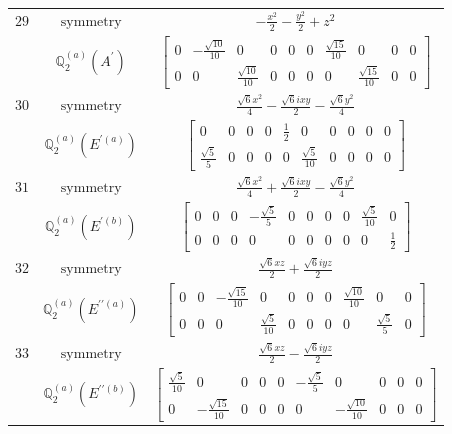 \documentclass[fleqn,8pt,landscape]{jsarticle}
\begin{document}
\begin{longtable}{ccc}
$ 29 $ & $ \text{symmetry} $ & $ - \frac{x^{2}}{2} - \frac{y^{2}}{2} + z^{2} $ \\
$  $ & $ \mathbb{Q}_{2}^{(a)}(A^{\prime}) $ & $ \begin{bmatrix} 0 & - \frac{\sqrt{10}}{10} & 0 & 0 & 0 & 0 & \frac{\sqrt{15}}{10} & 0 & 0 & 0 \\ 0 & 0 & \frac{\sqrt{10}}{10} & 0 & 0 & 0 & 0 & \frac{\sqrt{15}}{10} & 0 & 0 \end{bmatrix} $ \\ \hline
$ 30 $ & $ \text{symmetry} $ & $ \frac{\sqrt{6} x^{2}}{4} - \frac{\sqrt{6} i x y}{2} - \frac{\sqrt{6} y^{2}}{4} $ \\
$  $ & $ \mathbb{Q}_{2}^{(a)}(E^{\prime(a)}) $ & $ \begin{bmatrix} 0 & 0 & 0 & 0 & \frac{1}{2} & 0 & 0 & 0 & 0 & 0 \\ \frac{\sqrt{5}}{5} & 0 & 0 & 0 & 0 & \frac{\sqrt{5}}{10} & 0 & 0 & 0 & 0 \end{bmatrix} $ \\ \hline
$ 31 $ & $ \text{symmetry} $ & $ \frac{\sqrt{6} x^{2}}{4} + \frac{\sqrt{6} i x y}{2} - \frac{\sqrt{6} y^{2}}{4} $ \\
$  $ & $ \mathbb{Q}_{2}^{(a)}(E^{\prime(b)}) $ & $ \begin{bmatrix} 0 & 0 & 0 & - \frac{\sqrt{5}}{5} & 0 & 0 & 0 & 0 & \frac{\sqrt{5}}{10} & 0 \\ 0 & 0 & 0 & 0 & 0 & 0 & 0 & 0 & 0 & \frac{1}{2} \end{bmatrix} $ \\ \hline
$ 32 $ & $ \text{symmetry} $ & $ \frac{\sqrt{6} x z}{2} + \frac{\sqrt{6} i y z}{2} $ \\
$  $ & $ \mathbb{Q}_{2}^{(a)}(E^{\prime\prime(a)}) $ & $ \begin{bmatrix} 0 & 0 & - \frac{\sqrt{15}}{10} & 0 & 0 & 0 & 0 & \frac{\sqrt{10}}{10} & 0 & 0 \\ 0 & 0 & 0 & \frac{\sqrt{5}}{10} & 0 & 0 & 0 & 0 & \frac{\sqrt{5}}{5} & 0 \end{bmatrix} $ \\ \hline
$ 33 $ & $ \text{symmetry} $ & $ \frac{\sqrt{6} x z}{2} - \frac{\sqrt{6} i y z}{2} $ \\
$  $ & $ \mathbb{Q}_{2}^{(a)}(E^{\prime\prime(b)}) $ & $ \begin{bmatrix} \frac{\sqrt{5}}{10} & 0 & 0 & 0 & 0 & - \frac{\sqrt{5}}{5} & 0 & 0 & 0 & 0 \\ 0 & - \frac{\sqrt{15}}{10} & 0 & 0 & 0 & 0 & - \frac{\sqrt{10}}{10} & 0 & 0 & 0 \end{bmatrix} $ \\ \hline

\end{longtable}
\end{document}
